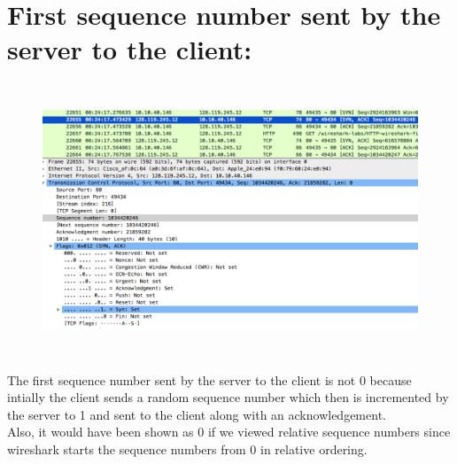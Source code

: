\documentclass[]{report}
\begin{document}
\section{First sequence number sent by the server to the client:}
\begin{figure}[H]
	\vspace{0pt}
	\includegraphics[height = 230pt, keepaspectratio]{Snapshots/q17.png}
\end{figure}
The first sequence number sent by the server to the client is not 0 because intially the client sends a random sequence number which then is incremented by the server to 1 and sent to the client along with an acknowledgement. \\ Also, it would have been shown as 0 if we viewed relative sequence numbers since wireshark starts the sequence numbers from 0 in relative ordering. 
\end{document}
